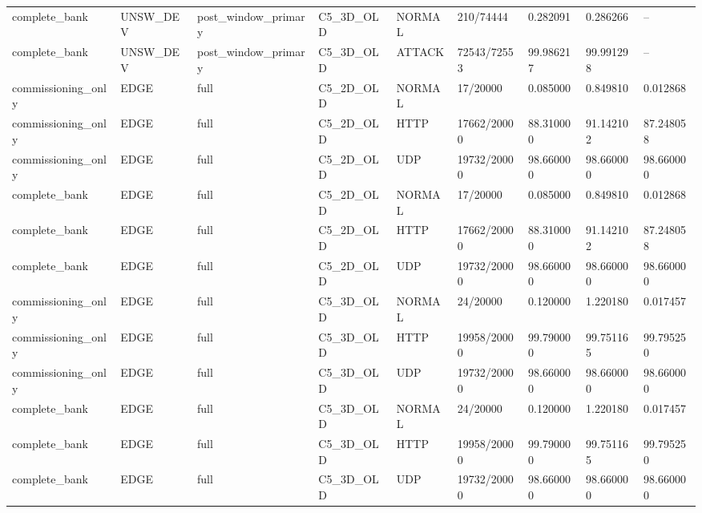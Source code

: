 \begin{tabular}{lllllllll}
complete\_bank & UNSW\_DEV & post\_window\_primary & C5\_3D\_OLD & NORMAL & 210/74444 & 0.282091 & 0.286266 & -- \\
complete\_bank & UNSW\_DEV & post\_window\_primary & C5\_3D\_OLD & ATTACK & 72543/72553 & 99.986217 & 99.991298 & -- \\
commissioning\_only & EDGE & full & C5\_2D\_OLD & NORMAL & 17/20000 & 0.085000 & 0.849810 & 0.012868 \\
commissioning\_only & EDGE & full & C5\_2D\_OLD & HTTP & 17662/20000 & 88.310000 & 91.142102 & 87.248058 \\
commissioning\_only & EDGE & full & C5\_2D\_OLD & UDP & 19732/20000 & 98.660000 & 98.660000 & 98.660000 \\
complete\_bank & EDGE & full & C5\_2D\_OLD & NORMAL & 17/20000 & 0.085000 & 0.849810 & 0.012868 \\
complete\_bank & EDGE & full & C5\_2D\_OLD & HTTP & 17662/20000 & 88.310000 & 91.142102 & 87.248058 \\
complete\_bank & EDGE & full & C5\_2D\_OLD & UDP & 19732/20000 & 98.660000 & 98.660000 & 98.660000 \\
commissioning\_only & EDGE & full & C5\_3D\_OLD & NORMAL & 24/20000 & 0.120000 & 1.220180 & 0.017457 \\
commissioning\_only & EDGE & full & C5\_3D\_OLD & HTTP & 19958/20000 & 99.790000 & 99.751165 & 99.795250 \\
commissioning\_only & EDGE & full & C5\_3D\_OLD & UDP & 19732/20000 & 98.660000 & 98.660000 & 98.660000 \\
complete\_bank & EDGE & full & C5\_3D\_OLD & NORMAL & 24/20000 & 0.120000 & 1.220180 & 0.017457 \\
complete\_bank & EDGE & full & C5\_3D\_OLD & HTTP & 19958/20000 & 99.790000 & 99.751165 & 99.795250 \\
complete\_bank & EDGE & full & C5\_3D\_OLD & UDP & 19732/20000 & 98.660000 & 98.660000 & 98.660000 \\
\hline
\end{tabular}
